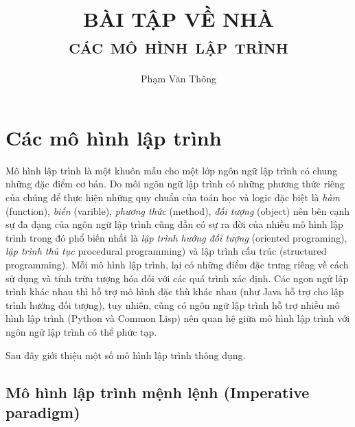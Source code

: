 \documentclass[10pt, a4paper]{article}
\begin{document}
\hypersetup{colorlinks=false, urlcolor=blue, linkcolor=green}
\pagestyle{fancy}
\cfoot{}
\rfoot{\thepage}


\author{Phạm Văn Thông}
\title{\textbf{\Huge{BÀI TẬP VỀ NHÀ}}\\ \textsc{các mô hình lập trình}}
\maketitle
\vspace{1cm}

\section{Các mô hình lập trình}

Mô hình lập trình là một khuôn mẫu cho một lớp ngôn ngữ lập trình có chung những đặc điểm cơ bản. Do môi ngôn ngữ lập trình có những phương thức riêng của chúng để thực hiện những quy chuẩn của toán học và logic đặc biệt là \emph{hàm} (function), \emph{biến} (varible), \emph{phương thức} (method), \emph{đối tượng} (object) nên bên cạnh sự đa dạng của ngôn ngữ lập trình cũng dần có sự ra đời của nhiều mô hình lập trình trong đó phổ biến nhất là \emph{lập trình hướng đối tượng} (oriented programing), \emph{lập trình thủ tục} procedural programming) và lập trình cấu trúc (structured programming). Mỗi mô hình lập trình, lại có những điểm đặc trưng riêng về cách sử dụng và tính trừu tượng hóa đối với các quá trình xác định. Các ngon ngử lập trình khác nhau thì hỗ trợ mô hình đặc thù khác nhau (như \textsf{Java} hỗ trợ cho lập trình hướng đối tượng), tuy nhiên, cũng có ngôn ngữ lập trình hỗ trợ nhiều mô hình lập trình (\textsf{Python} và \textsf{Common Lisp}) nên quan hệ giữa mô hình lập trình với ngôn ngữ lập trình có thể phức tạp.

Sau đây giới thiệu một số mô hình lập trình thông dụng.

\subsection{Mô hình lập trình mệnh lệnh (Imperative paradigm)}
\end{document}
